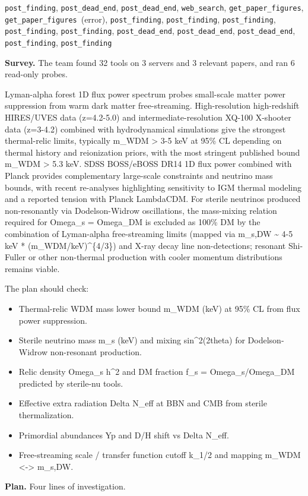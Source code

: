 \documentclass[11pt,a4paper]{article}
\begin{document}
\texttt{post\_finding}, \texttt{post\_dead\_end}, \texttt{post\_dead\_end}, \texttt{web\_search}, \texttt{get\_paper\_figures}, \texttt{get\_paper\_figures}~(error), \texttt{post\_finding}, \texttt{post\_finding}, \texttt{post\_finding}, \texttt{post\_finding}, \texttt{post\_finding}, \texttt{post\_dead\_end}, \texttt{post\_dead\_end}, \texttt{post\_dead\_end}, \texttt{post\_finding}, \texttt{post\_finding}\par
\textbf{Survey.} The team found 32 tools on 3 servers and 3 relevant papers, and ran 6 read-only probes.

Lyman-alpha forest 1D flux power spectrum probes small-scale matter power suppression from warm dark matter free-streaming. High-resolution high-redshift HIRES/UVES data (z=4.2-5.0) and intermediate-resolution XQ-100 X-shooter data (z=3-4.2) combined with hydrodynamical simulations give the strongest thermal-relic limits, typically m\_WDM \textgreater{} 3-5 keV at 95\% CL depending on thermal history and reionization priors, with the most stringent published bound m\_WDM \textgreater{} 5.3 keV. SDSS BOSS/eBOSS DR14 1D flux power combined with Planck provides complementary large-scale constraints and neutrino mass bounds, with recent re-analyses highlighting sensitivity to IGM thermal modeling and a reported tension with Planck LambdaCDM. For sterile neutrinos produced non-resonantly via Dodelson-Widrow oscillations, the mass-mixing relation required for Omega\_s = Omega\_DM is excluded as 100\% DM by the combination of Lyman-alpha free-streaming limits (mapped via m\_s,DW \textasciitilde{} 4-5 keV * (m\_WDM/keV)\textasciicircum{}\{4/3\}) and X-ray decay line non-detections; resonant Shi-Fuller or other non-thermal production with cooler momentum distributions remains viable.

The plan should check:

\begin{itemize}
  \item Thermal-relic WDM mass lower bound m\_WDM (keV) at 95\% CL from flux power suppression.
  \item Sterile neutrino mass m\_s (keV) and mixing sin\textasciicircum{}2(2theta) for Dodelson-Widrow non-resonant production.
  \item Relic density Omega\_s h\textasciicircum{}2 and DM fraction f\_s = Omega\_s/Omega\_DM predicted by sterile-nu tools.
  \item Effective extra radiation Delta N\_eff at BBN and CMB from sterile thermalization.
  \item Primordial abundances Yp and D/H shift vs Delta N\_eff.
  \item Free-streaming scale / transfer function cutoff k\_1/2 and mapping m\_WDM \textless{}-\textgreater{} m\_s,DW.
\end{itemize}
\textbf{Plan.} Four lines of investigation.
\end{document}

